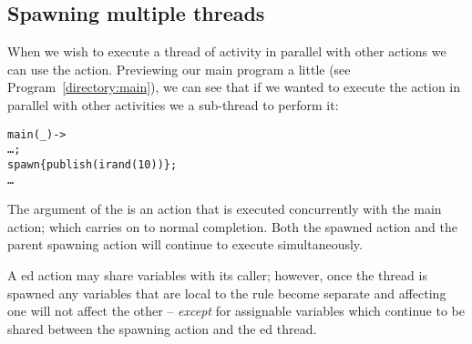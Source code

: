 \subsection{Spawning multiple threads}
When we wish to execute a thread of activity in parallel with other actions we can use the  action. Previewing our main program a little (see Program~\vref{directory:main}), we can see that if we wanted to execute the  action in parallel with other activities we  a sub-thread to perform it:
\begin{alltt}
main(\_) ->
  \ldots;
  spawn\{ publish(irand(10)) \}; 
  \ldots
\end{alltt}
The argument of the  is an action that is executed concurrently with the main action; which carries on to normal completion. Both the spawned action and the parent spawning action will continue to execute simultaneously.

A ed action may share variables with its caller; however, once the thread is spawned any variables that are local to the rule become separate and affecting one will not affect the other -- \emph{except} for assignable variables which continue to be shared between the spawning action and the ed thread.


